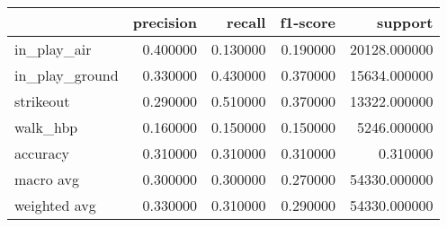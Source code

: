 \begin{tabular}{lrrrr}
\toprule
 & precision & recall & f1-score & support \\
\midrule
in_play_air & 0.400000 & 0.130000 & 0.190000 & 20128.000000 \\
in_play_ground & 0.330000 & 0.430000 & 0.370000 & 15634.000000 \\
strikeout & 0.290000 & 0.510000 & 0.370000 & 13322.000000 \\
walk_hbp & 0.160000 & 0.150000 & 0.150000 & 5246.000000 \\
accuracy & 0.310000 & 0.310000 & 0.310000 & 0.310000 \\
macro avg & 0.300000 & 0.300000 & 0.270000 & 54330.000000 \\
weighted avg & 0.330000 & 0.310000 & 0.290000 & 54330.000000 \\
\bottomrule
\end{tabular}
